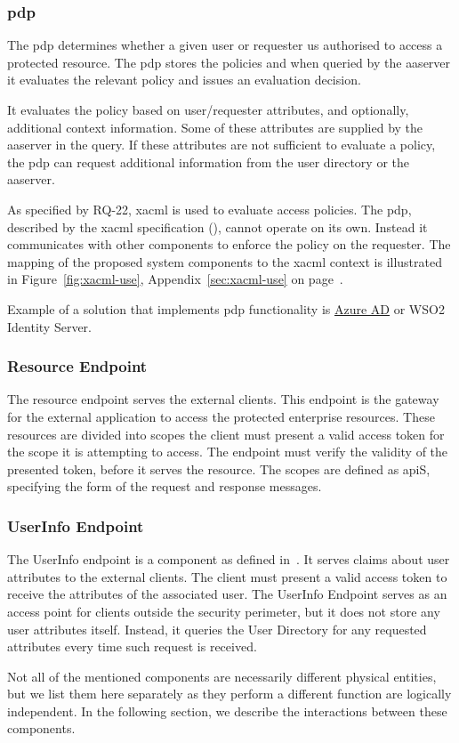 \subsubsection{\acrlong{pdp}}
The \acrfull{pdp} determines whether a given user or requester us authorised to access a protected resource. The \acrshort{pdp} stores the policies and when queried by the \acrshort{aaserver} it evaluates the relevant policy and issues an evaluation decision.

It evaluates the policy based on user/requester attributes, and optionally, additional context information. Some of these attributes are supplied by the \acrshort{aaserver} in the query. If these attributes are not sufficient to evaluate a policy, the \acrshort{pdp} can request additional information from the user directory or the \acrshort{aaserver}.

As specified by RQ-22, \acrshort{xacml} is used to evaluate access policies. The \acrshort{pdp}, described by the \acrshort{xacml} specification (\cite{OASISStandard2013EXtensible3.0}), cannot operate on its own. Instead it communicates with other components to enforce the policy on the requester. The mapping of the proposed system components to the \acrshort{xacml} context is illustrated in Figure~\ref{fig:xacml-use}, Appendix~\ref{sec:xacml-use} on page~\pageref{fig:xacml-use}.

Example of a solution that implements \acrshort{pdp} functionality is \href{sec:online-access-control}{Azure AD} or WSO2 Identity Server\footnotemark.
% 
    
\subsubsection{Resource Endpoint}
The resource endpoint serves the external clients. This endpoint is the gateway for the external application to access the protected enterprise resources. These resources are divided into scopes the client must present a valid access token for the scope it is attempting to access. The endpoint must verify the validity of the presented token, before it serves the resource. The scopes are defined as \acrshort{api}S, specifying the form of the request and response messages.
    
\subsubsection{UserInfo Endpoint}
The UserInfo endpoint is a component as defined in~\cite{Sakimura2014Final:1}. It serves claims about user attributes to the external clients. The client must present a valid access token to receive the attributes of the associated user. The UserInfo Endpoint serves as an access point for clients outside the security perimeter, but it does not store any user attributes itself. Instead, it queries the User Directory for any requested attributes every time such request is received.

\bigskip \noindent
Not all of the mentioned components are necessarily different physical entities, but we list them here separately as they perform a different function are logically independent. In the following section, we describe the interactions between these components.